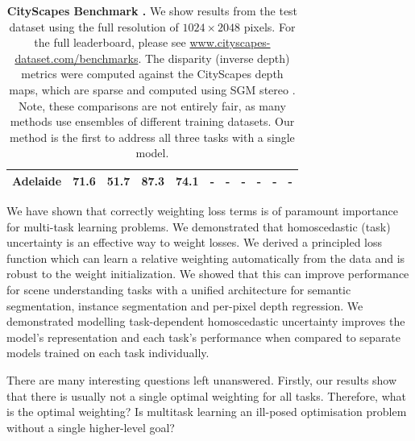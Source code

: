 {\begin{landscape}
\begin{table}[t]
{\begin{tabular}{l|c|c|c|c|c|c|c|c|c|c}
			Adelaide \cite{lin2015efficient} & 71.6 & 51.7 & 87.3 & 74.1 &-&-&-&-&-&-\\%
            \bottomrule
		\end{tabular}}
	\caption[CityScapes Benchmark.]{\textbf{CityScapes Benchmark \cite{Cordts2016Cityscapes}.} We show results from the test dataset using the full resolution of $1024\times2048$ pixels. For the full leaderboard, please see \url{www.cityscapes-dataset.com/benchmarks}. The disparity (inverse depth) metrics were computed against the CityScapes depth maps, which are sparse and computed using SGM stereo \cite{hirschmuller2005accurate}. Note, these comparisons are not entirely fair, as many methods use ensembles of different training datasets. Our method is the first to address all three tasks with a single model.}
	\label{tbl:benchmarks}
\end{table}
\end{landscape}
\clearpage%
}

We have shown that correctly weighting loss terms is of paramount importance for multi-task learning problems. We demonstrated that homoscedastic (task) uncertainty is an effective way to weight losses. We derived a principled loss function which can learn a relative weighting automatically from the data and is robust to the weight initialization. We showed that this can improve performance for scene understanding tasks with a unified architecture for semantic segmentation, instance segmentation and per-pixel depth regression. We demonstrated modelling task-dependent homoscedastic uncertainty improves the model's representation and each task's performance when compared to separate models trained on each task individually.

There are many interesting questions left unanswered. Firstly, our results show that there is usually not a single optimal weighting for all tasks. Therefore, what is the optimal weighting? Is multitask learning an ill-posed optimisation problem without a single higher-level goal?

